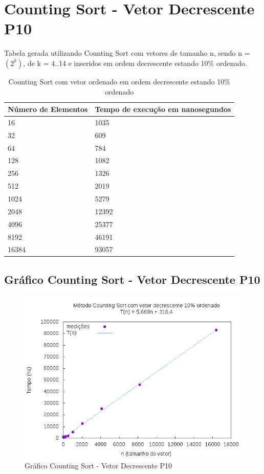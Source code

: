 \documentclass[12pt,a4paper,twoside]{report}
\begin{document}
\section{Counting Sort - Vetor Decrescente P10}
Tabela gerada utilizando Counting Sort com vetores de tamanho n, sendo n = $(2^k)$, de k = 4..14 e inseridos em ordem decrescente estando 10\% ordenado.
\begin{table}[H]
\centering
\caption{Counting Sort com vetor ordenado em ordem decrescente estando 10\% ordenado}
\label{my-label}
\begin{tabular}{|l|l|}
\hline
\multicolumn{1}{|c|}{\textbf{Número de Elementos}} & \multicolumn{1}{c|}{\textbf{Tempo de execução em nanosegundos}} \\ \hline
16 & 1035 \\ \hline
32 & 609 \\ \hline
64 & 784 \\ \hline
128 & 1082 \\ \hline
256 & 1326 \\ \hline
512 & 2019 \\ \hline
1024 & 5279 \\ \hline
2048 & 12392 \\ \hline
4096 & 25377 \\ \hline
8192 & 46191 \\ \hline
16384 & 93057 \\ \hline
\end{tabular}
\end{table}

\subsection{Gráfico Counting Sort - Vetor Decrescente P10}
\begin{figure}[H]
    \centering
    \includegraphics[width=0.7\linewidth]{graficos/CountingSort/vIntDecrescenteP10/vIntDecrescenteP10.png}
  \caption{Gráfico Counting Sort - Vetor Decrescente P10}
\end{figure}
\end{document}
